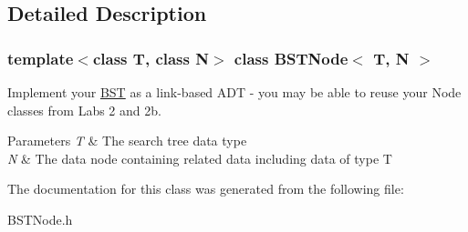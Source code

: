 \subsection{Detailed Description}
\subsubsection*{template$<$class T, class N$>$\newline
class B\+S\+T\+Node$<$ T, N $>$}

Implement your \hyperlink{class_b_s_t}{B\+ST} as a link-\/based A\+DT -\/ you may be able to reuse your Node classes from Labs 2 and 2b. 
\begin{DoxyParams}{Parameters}
{\em T} & The search tree data type \\
\hline
{\em N} & The data node containing related data including data of type T \\
\hline
\end{DoxyParams}


The documentation for this class was generated from the following file\+:\begin{DoxyCompactItemize}
\item 
B\+S\+T\+Node.\+h\end{DoxyCompactItemize}
